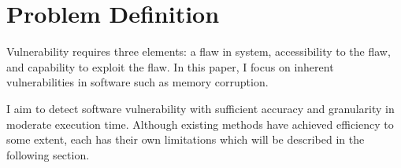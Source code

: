 \section{Problem Definition}
\label{section:problem}

Vulnerability requires three elements: a flaw in system, accessibility to the flaw, and capability to exploit the flaw.
In this paper, I focus on inherent vulnerabilities in software such as memory corruption.

I aim to detect software vulnerability with sufficient accuracy and granularity in moderate execution time.
Although existing methods have achieved efficiency to some extent, each has their own limitations which will be described in the following section.